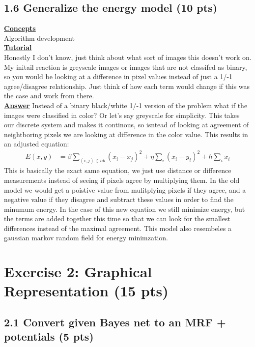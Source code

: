 \documentclass[11pt]{article}
\begin{document}
\subsection{1.6 Generalize the energy model (10 pts)}
\noindent \textbf{\underline{Concepts}}\\
Algorithm development\\
\noindent \textbf{\underline{Tutorial}}\\
Honestly I don't know, just think about what sort of images this doesn't work on.  My initail reaction is greyscale images or images that are not classifed as binary,
 so you would be looking at a difference in pixel values instead of just a 1/-1 agree/disagree relationship.  Just think of how each term would change if this was the
 case and work from there.\\
\noindent \textbf{\underline{Answer}} Instead of a binary black/white 1/-1 version of the problem what if the images were classified in color?  Or let's say greyscale
 for simplicity.  This takes our discrete system and makes it continous, so isntead of looking at agreement of neightboring pixels we are looking at difference in
 the color value.  This results in an adjusted equation:
\begin{align*}
    E(x,y)  &= \beta \sum_{(i,j) \in nb}(x_{i} - x_{j})^{2} + \eta \sum_{i} (x_{i} - y_{i})^{2} + h \sum_{i}x_{i}
\end{align*}
This is basically the exact same equation, we just use distance or difference measurements instead of seeing if pixels agree by multiplying them.  In the old model we
 would get a poistive value from mulitplying pixels if they agree, and a negative value if they disagree and subtract these values in order to find the minumum energy.  In
 the case of this new equation we still minimize energy, but the terms are added together this time so that we can look for the smallest differences instead of the maximal
 agreement.  This model also resembeles a gaussian markov random field for energy minimzation.\\
\section{Exercise 2: Graphical Representation (15 pts)}

\subsection{2.1 Convert given Bayes net to an MRF + potentials (5 pts)}
\end{document}
